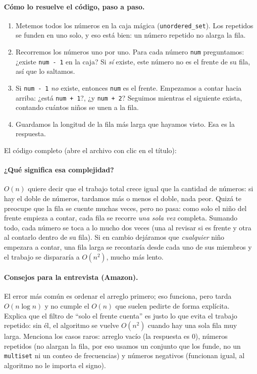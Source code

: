 \paragraph{Cómo lo resuelve el código, paso a paso.}
\begin{enumerate}
  \item Metemos todos los números en la caja mágica
        (\texttt{unordered\_set}). Los repetidos se funden en uno solo, y
        eso está bien: un número repetido no alarga la fila.
  \item Recorremos los números uno por uno. Para cada número \texttt{num}
        preguntamos: ¿existe \texttt{num - 1} en la caja? Si \emph{sí}
        existe, este número no es el frente de su fila, así que lo
        saltamos.
  \item Si \texttt{num - 1} \emph{no} existe, entonces \texttt{num} es el
        frente. Empezamos a contar hacia arriba: ¿está \texttt{num + 1}?,
        ¿y \texttt{num + 2}? Seguimos mientras el siguiente exista,
        contando cuántos niños se unen a la fila.
  \item Guardamos la longitud de la fila más larga que hayamos visto. Esa
        es la respuesta.
\end{enumerate}
El código completo (abre el archivo con clic en el título):




\paragraph{¿Qué significa esa complejidad?} $O(n)$ quiere decir que el
trabajo total crece igual que la cantidad de números: si hay el doble de
números, tardamos más o menos el doble, nada peor. Quizá te preocupe que la
fila se cuente muchas veces, pero no pasa: como solo el niño del frente
empieza a contar, cada fila se recorre \emph{una sola vez} completa. Sumando
todo, cada número se toca a lo mucho dos veces (una al revisar si es frente y
otra al contarlo dentro de su fila). Si en cambio dejáramos que
\emph{cualquier} niño empezara a contar, una fila larga se recontaría desde
cada uno de sus miembros y el trabajo se dispararía a $O(n^2)$, mucho más
lento.

\paragraph{Consejos para la entrevista (Amazon).} El error más común es
ordenar el arreglo primero; eso funciona, pero tarda $O(n \log n)$ y no
cumple el $O(n)$ que suelen pedirte de forma explícita. Explica que el filtro
de ``solo el frente cuenta'' es justo lo que evita el trabajo repetido: sin
él, el algoritmo se vuelve $O(n^2)$ cuando hay una sola fila muy larga.
Menciona los casos raros: arreglo vacío (la respuesta es $0$), números
repetidos (no alargan la fila, por eso usamos un conjunto que los funde, no
un \texttt{multiset} ni un conteo de frecuencias) y números negativos
(funcionan igual, al algoritmo no le importa el signo).
